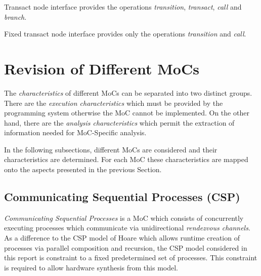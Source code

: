 \begin{definition}\label{transact-node-interface-type}
Transact node interface provides the operations
\emph{transition}, \emph{transact}, \emph{call} and \emph{branch}.
\end{definition}

\begin{definition}\label{fixed-transact-node-interface-type}
Fixed transact node interface provides only the operations
\emph{transition} and \emph{call}.
\end{definition}


\section{Revision of Different MoCs}\label{revision-of-mocs}

The \emph{characteristics} of different MoCs can be separated into two distinct groups.
There are the \emph{execution characteristics} which must be provided by
the programming system otherwise the MoC cannot be implemented.
On the other hand, there are the \emph{analysis characteristics} which
permit the extraction of information needed for MoC-Specific analysis.

In the following subsections, different MoCs are considered and their
characteristics are determined. For each MoC these characteristics are
mapped onto the aspects presented in the previous Section.

\subsection{Communicating Sequential Processes (CSP)}
\emph{Communicating Sequential Processes} \cite{csphoare:1985}
is a MoC which consists of concurrently executing processes
which communicate via unidirectional \emph{rendezvous channels}.
As a difference to the CSP model of Hoare \cite{csphoare:1985}
which allows runtime creation of processes via parallel
composition and recursion, the CSP model considered in this report
is constraint to a fixed predetermined set of processes.
This constraint is required to allow hardware synthesis from this
model.

